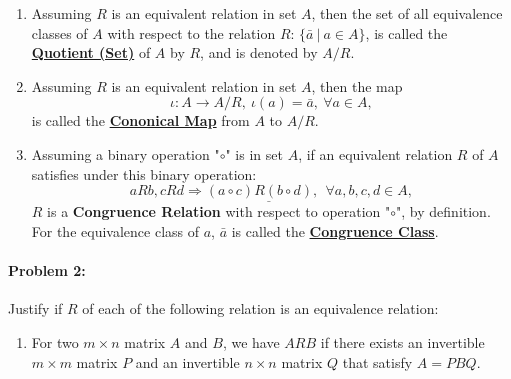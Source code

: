\documentclass[12pt]{scrartcl}
\begin{document}
{{\begin{enumerate}[label=(\alph*)]
	\item \begin{spacing}{1.2}Assuming $R$ is an equivalent relation in set $A$, then the set of all equivalence classes of $A$ with respect to the relation $R$: $\{\bar{a} ~ | ~ a \in A\}$, is called the \underline{\textbf{Quotient (Set)}} of $A$ by $R$, and is denoted by \underline{$A/R$}. \end{spacing}
	\vspace{0.5em}

	\item \begin{spacing}{1.2}Assuming $R$ is an equivalent relation in set $A$, then the map $$\iota: A \rightarrow A/R, ~\iota(a) = \bar{a}, ~\forall a \in A,$$ is called the \underline{\textbf{Cononical Map}} from $A$ to $A/R$. \end{spacing}
	\vspace{0.5em}

	\item \begin{spacing}{1.2}Assuming a binary operation "$\circ$" is in set $A$, if an equivalent relation $R$ of $A$ satisfies under this binary operation: $$\underline{aRb, cRd \Longrightarrow (a \circ c) R (b \circ d), ~~\forall a,b,c,d \in A},$$ $R$ is a \textbf{Congruence Relation} with respect to operation "$\circ$", by definition. For the equivalence class of $a$, $\bar{a}$ is called the \underline{\textbf{Congruence Class}}.\end{spacing}

	\end{enumerate}

\newpage

\paragraph*{Problem 2: } Justify if $R$ of each of the following relation is an equivalence relation:

	\begin{enumerate}[label=\textbf{\arabic*)}]
	
	\item For two $m \times n$ matrix $A$ and $B$, we have $ARB$ if there exists an invertible $m \times m$ matrix $P$ and an invertible $n \times n$ matrix $Q$ that satisfy $A=PBQ$.
	
\end{enumerate}}}
\end{document}

